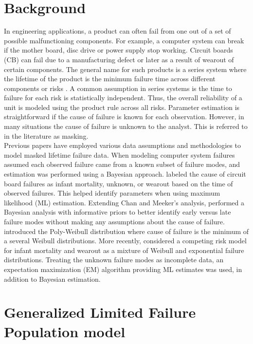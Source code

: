 \documentclass[12pt]{article}
\begin{document}
\section{Background}
\label{sec:Background}
In engineering applications, a product can often fail from one out of a set of possible malfunctioning components.  For example, a computer system can break if the mother board, disc drive or power supply stop working.  Circuit boards (CB) can fail due to a manufacturing defect or later as a result of wearout of certain components.  The general name for such products is a series system where the lifetime of the product is the minimum failure time across different components or risks \citep[Chapter 5]{nelson}.  A common assumption in series systems is the time to failure for each risk is statistically independent.  Thus, the overall reliability of a unit is modeled using the product rule across all risks.  Parameter estimation is straightforward if the cause of failure is known for each observation.  However, in many situations the cause of failure is unknown to the analyst. This is referred to in the literature as masking.\\

Previous papers have employed various data assumptions and methodologies to model masked lifetime failure data.  When modeling computer system failures \citet{reiser} assumed each observed failure came from a known subset of failure modes, and estimation was performed using a Bayesian approach.  \cite{chan} labeled the cause of circuit board failures as infant mortality, unknown, or wearout based on the time of observed failures.  This helped identify parameters when using maximum likelihood (ML) estimation.  Extending Chan and Meeker's analysis, \citet{basu} performed a Bayesian analysis with informative priors to better identify early versus late failure modes without making any assumptions about the cause of failure.  \cite{berger} introduced the Poly-Weibull distribution where cause of failure is the minimum of a several Weibull distributions.  More recently, \cite{ranjan} considered a competing risk model for infant mortality and wearout as a mixture of Weibull and exponential failure distributions.  Treating the unknown failure modes as incomplete data, an expectation maximization (EM) algorithm providing ML estimates was used, in addition to Bayesian estimation.


\section{Generalized Limited Failure Population model}
\label{sec:GLFP model}
\end{document}
